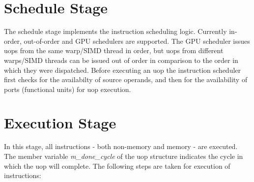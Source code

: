 

\section{Schedule Stage}


The schedule stage implements the instruction scheduling logic. Currently
in-order, out-of-order and GPU schedulers are supported. The GPU scheduler
issues uops from the same warp/SIMD thread in order, but uops from different
warps/SIMD threads can be issued out of order in comparison to the order in
which they were dispatched. Before executing an uop the instruction scheduler
first checks for the availabilty of source operands, and then for the
availability of ports (functional units) for uop execution. 


\section{Execution Stage}

In this stage, all instructions - both non-memory and memory - are executed.
The member variable \textit{m\_done\_cycle} of the uop structure indicates the
cycle in which the uop will complete. The following steps are taken for
execution of instructions:

